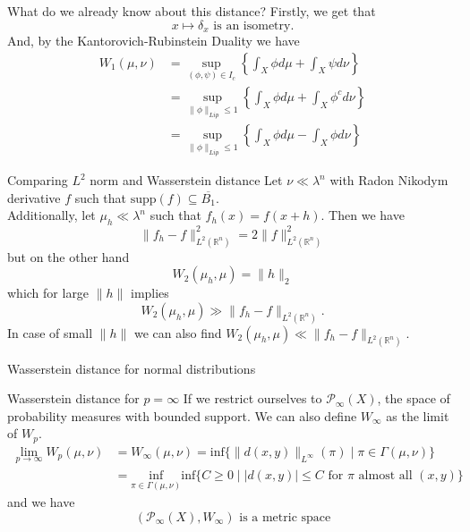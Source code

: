 \documentclass[10pt]{beamer}
\begin{document}
\begin{frame}{What do we already know about this distance?}
    Firstly, we get that $$x \mapsto \delta_x \text{ is an isometry.}$$ 
    And, by the Kantorovich-Rubinstein Duality we have \begin{align*} W_1(\mu,\nu) &= \sup_{(\phi,\psi) \in I_c} \left\{ \int_X \phi d\mu + \int_X \psi d\nu \right\} \\ &= \sup_{\|\phi\|_{Lip} \leq 1} \left\{\int_X \phi d\mu + \int_X \phi^c d\nu  \right\} 
       \\ &= \sup_{\|\phi\|_{Lip} \leq 1} \left\{\int_X \phi d\mu - \int_X \phi d\nu  \right\} \end{align*}
\end{frame}


\begin{frame}{Comparing $L^2$ norm and Wasserstein distance}
    Let $\nu \ll \lambda^n$ with Radon Nikodym derivative $f$ such that $\text{supp}(f) \subseteq \overline{B_1}$. \\ 
    \vspace{0.5cm}
        Additionally, let $\mu_h \ll \lambda^n$ such that $f_h(x) = f(x+h)$. Then we have $$\|f_h-f\|^2_{L^2(\mathbb{R}^n)} = 2\|f\|_{L^2(\mathbb{R}^n)}^2$$ but on the other hand $$W_2(\mu_h,\mu) = \|h\|_2$$ which for large $\|h\|$ implies $$W_2(\mu_h,\mu) \gg \|f_h-f\|_{L^2(\mathbb{R}^n)}.$$ In case of small $\|h\|$ we can also find $W_2(\mu_h,\mu) \ll \|f_h-f\|_{L^2(\mathbb{R}^n)}$.
\end{frame}

\begin{frame}{Wasserstein distance for normal distributions}
    
\end{frame}


\begin{frame}{Wasserstein distance for $p = \infty$}
    If we restrict ourselves to $\mathcal{P}_\infty(X)$, the space of probability measures with bounded support. We can also define $W_\infty$ as the limit of $W_p$.
    \begin{align*}\lim_{p \to \infty} W_p(\mu,\nu) &= W_\infty(\mu,\nu) =\text{inf}\{\|d(x,y)\|_{L^\infty}(\pi) \mid \pi \in \Gamma(\mu,\nu)\} \\
    &= \underset{\pi \in \Gamma(\mu,\nu)}{\text{inf}}\text{inf}\{C \geq 0 \mid |d(x,y)| \leq C \text{ for } \pi \text{ almost all } (x,y)\} \end{align*} 
    and we have $$(\mathcal{P}_\infty(X), W_\infty) \text{ is a metric space}$$
\end{frame}
\end{document}
